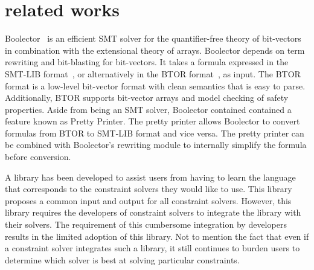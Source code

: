 \section{related works}
\label{sec:related}


Boolector~\cite{boolector2009} is an efficient SMT solver for the quantifier-free theory
of bit-vectors in combination with the extensional theory of arrays.
Boolector depends on term rewriting and bit-blasting for bit-vectors. It
takes a formula expressed in the SMT-LIB format~\cite{smtlib2015}, or alternatively in
the BTOR format~\cite{btor2008}, as input.
The BTOR format is a low-level bit-vector format
with clean semantics that is easy to parse. Additionally, BTOR supports bit-vector
arrays and model checking of safety properties.
Aside from being an SMT solver, Boolector contained contained a feature known as
Pretty Printer. The pretty printer allows Boolector to convert formulas from BTOR to
SMT-LIB format and vice versa. The pretty printer can be combined with Boolector’s
rewriting module to internally simplify the formula before conversion.


A library has been developed to assist users from having to learn the language that
corresponds to the constraint solvers they would like to use.
This library proposes a common input and output for all constraint solvers.
However, this library requires the
developers of constraint solvers to integrate the library with their solvers.
The requirement of this cumbersome integration by developers results in
the limited adoption of this library. Not to mention the fact that even if a
constraint solver integrates such a library, it still continues to burden users to
determine which solver is best at solving particular constraints.